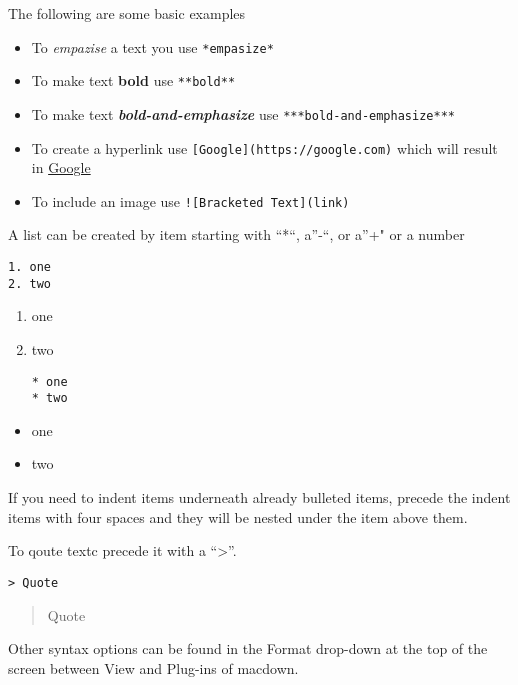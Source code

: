 The following are some basic examples

\begin{itemize}

\item
  To \emph{empazise} a text you use \texttt{*empasize*}
\item
  To make text \textbf{bold} use \texttt{**bold**}
\item
  To make text \textbf{\emph{bold-and-emphasize}} use
  \texttt{***bold-and-emphasize***}
\item
  To create a hyperlink use \texttt{{[}Google{]}(https://google.com)}
  which will result in \href{https://google.com}{Google}
\item
  To include an image use \texttt{!{[}Bracketed\ Text{]}(link)}
\end{itemize}

A list can be created by item starting with ``*``, a''-``, or a''+" or a
number

\begin{verbatim}
1. one
2. two
\end{verbatim}

\begin{enumerate}
\def\labelenumi{\arabic{enumi}.}
\item
  one
\item
  two

\begin{verbatim}
* one
* two
\end{verbatim}
\end{enumerate}

\begin{itemize}

\item
  one
\item
  two
\end{itemize}

If you need to indent items underneath already bulleted items, precede
the indent items with four spaces and they will be nested under the item
above them.

To qoute textc precede it with a ``\textgreater{}''.

\begin{verbatim}
> Quote
\end{verbatim}

\begin{quote}
Quote
\end{quote}

Other syntax options can be found in the Format drop-down at the top of
the screen between View and Plug-ins of macdown.

